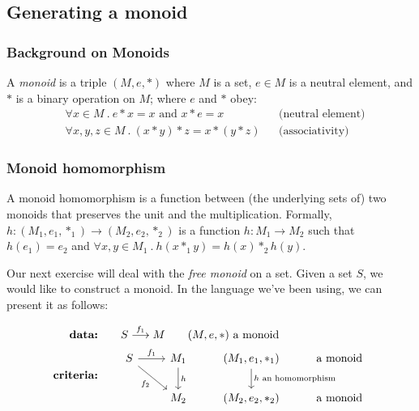     
    \subsection{Generating a monoid}
    
    \subsubsection*{Background on Monoids}
    
    A \emph{monoid} is a triple $(M, e, \ast)$ where $M$ is a set, $e \in M$ is a
    neutral element, and $\ast$ is a binary operation on $M$; where $e$ and $\ast$
    obey:
    \begin{align*}
        & \forall x \in M\ .\ 
        e \ast x = x \text{ and } x \ast e = x && \text{(neutral
        element)} \\
        & \forall x,y,z \in M\ .\ 
        (x \ast y) \ast z = x \ast (y \ast z) && \text{(associativity)}
    \end{align*}
    
    \subsubsection*{Monoid homomorphism}
    
    A monoid homomorphism is a function between (the underlying sets of) two
    monoids that preserves the unit and the multiplication. Formally,
    $h : (M_1, e_1, \ast_1) \rightarrow (M_2, e_2, \ast_2)$ is a function
    $h: M_1\to M_2$ such that $h(e_1) = e_2$ and
    $\forall x, y \in M_1\ .\ h(x \ast_1 y) = h(x) \ast_2 h(y)$.
    
    Our next exercise will deal with the \emph{free monoid} on a set.
    Given a set $S$, we would like to construct a monoid. In the language we've
    been using, we can present it as follows:
    
    \begin{align*}
        \textbf{data:}\qquad& S \overset{f_1}{\longrightarrow}M
        \qquad \text{$(M,e,\ast)$ a monoid}\\
        \textbf{criteria:}\qquad& \begin{tikzcd}[ampersand replacement=\&]
            S \arrow[r, "f_1"] \arrow[dr, swap, "f_2"] \& 
            M_1 
            \arrow[d, "h"] 
            \& (M_1,e_1,\ast_1) 
            \arrow[d, "\text{$h$ an homomorphism}"] 
            \& \text{a monoid}
            \\
            {}  
            \& M_2 \& (M_2,e_2,\ast_2) \& \text{a monoid}
        \end{tikzcd}
    \end{align*}
    
